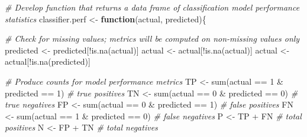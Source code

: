 \documentclass[
]{book}
\newenvironment{Shaded}{\begin{snugshade}}{\end{snugshade}}
\newcommand{\CommentTok}[1]{\textcolor[rgb]{0.56,0.35,0.01}{\textit{#1}}}
\newcommand{\ControlFlowTok}[1]{\textcolor[rgb]{0.13,0.29,0.53}{\textbf{#1}}}
\newcommand{\DecValTok}[1]{\textcolor[rgb]{0.00,0.00,0.81}{#1}}
\newcommand{\FunctionTok}[1]{\textcolor[rgb]{0.00,0.00,0.00}{#1}}
\newcommand{\NormalTok}[1]{#1}
\newcommand{\OtherTok}[1]{\textcolor[rgb]{0.56,0.35,0.01}{#1}}
\newcommand{\SpecialCharTok}[1]{\textcolor[rgb]{0.00,0.00,0.00}{#1}}
\begin{document}
\begin{Shaded}
\begin{Highlighting}[]
\CommentTok{\# Develop function that returns a data frame of classification model performance statistics}
\NormalTok{classifier.perf }\OtherTok{\textless{}{-}} \ControlFlowTok{function}\NormalTok{(actual, predicted)\{}
  
  \CommentTok{\# Check for missing values; metrics will be computed on non{-}missing values only}
\NormalTok{  predicted }\OtherTok{\textless{}{-}}\NormalTok{ predicted[}\SpecialCharTok{!}\FunctionTok{is.na}\NormalTok{(actual)]}
\NormalTok{  actual }\OtherTok{\textless{}{-}}\NormalTok{ actual[}\SpecialCharTok{!}\FunctionTok{is.na}\NormalTok{(actual)]}
\NormalTok{  actual }\OtherTok{\textless{}{-}}\NormalTok{ actual[}\SpecialCharTok{!}\FunctionTok{is.na}\NormalTok{(predicted)]}
  
  \CommentTok{\# Produce counts for model performance metrics}
\NormalTok{  TP }\OtherTok{\textless{}{-}} \FunctionTok{sum}\NormalTok{(actual }\SpecialCharTok{==} \DecValTok{1} \SpecialCharTok{\&}\NormalTok{ predicted }\SpecialCharTok{==} \DecValTok{1}\NormalTok{) }\CommentTok{\# true positives}
\NormalTok{  TN }\OtherTok{\textless{}{-}} \FunctionTok{sum}\NormalTok{(actual }\SpecialCharTok{==} \DecValTok{0} \SpecialCharTok{\&}\NormalTok{ predicted }\SpecialCharTok{==} \DecValTok{0}\NormalTok{) }\CommentTok{\# true negatives}
\NormalTok{  FP }\OtherTok{\textless{}{-}} \FunctionTok{sum}\NormalTok{(actual }\SpecialCharTok{==} \DecValTok{0} \SpecialCharTok{\&}\NormalTok{ predicted }\SpecialCharTok{==} \DecValTok{1}\NormalTok{) }\CommentTok{\# false positives}
\NormalTok{  FN }\OtherTok{\textless{}{-}} \FunctionTok{sum}\NormalTok{(actual }\SpecialCharTok{==} \DecValTok{1} \SpecialCharTok{\&}\NormalTok{ predicted }\SpecialCharTok{==} \DecValTok{0}\NormalTok{) }\CommentTok{\# false negatives}
\NormalTok{  P }\OtherTok{\textless{}{-}}\NormalTok{ TP }\SpecialCharTok{+}\NormalTok{ FN }\CommentTok{\# total positives}
\NormalTok{  N }\OtherTok{\textless{}{-}}\NormalTok{ FP }\SpecialCharTok{+}\NormalTok{ TN }\CommentTok{\# total negatives}
  

\end{Highlighting}
\end{Shaded}
\end{document}
